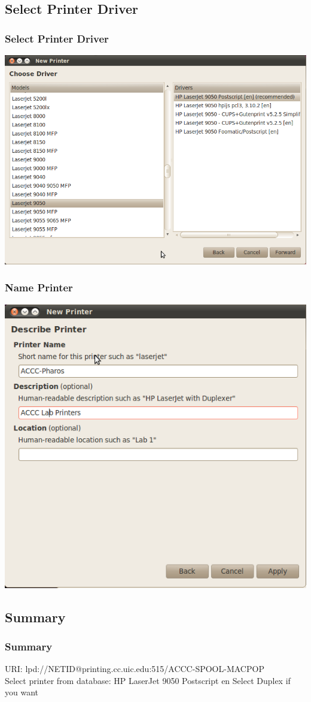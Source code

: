 \documentclass[hyperref={pdfpagelabels=false}]{beamer}
\begin{document}
\subsection{Select Printer Driver}
\frame
{
    \frametitle{Select Printer Driver}
     \includegraphics[totalheight=0.8\textheight]{PrinterDriver.png}
}
\frame
{
    \frametitle{Name Printer}
     \includegraphics[totalheight=0.8\textheight]{PrinterName.png}

}
\subsection{Summary}
\frame
{
    \frametitle{Summary}
URI: lpd://NETID@printing.cc.uic.edu:515/ACCC-SPOOL-MACPOP\\
Select printer from database: HP LaserJet 9050 Postscript en
Select Duplex if you want
}
\end{document}
